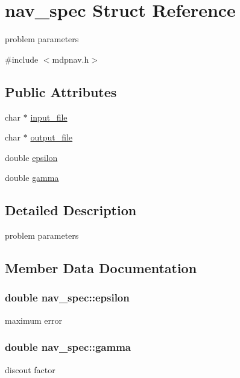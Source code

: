 \hypertarget{structnav__spec}{}\section{nav\+\_\+spec Struct Reference}
\label{structnav__spec}


problem parameters  




{\ttfamily \#include $<$mdpnav.\+h$>$}

\subsection*{Public Attributes}
\begin{DoxyCompactItemize}
\item 
char $\ast$ \hyperlink{structnav__spec_abb0e727791cf0839df7cea5433bff423}{input\+\_\+file}
\item 
char $\ast$ \hyperlink{structnav__spec_a9d92be20ca9352274aa021679e5c2020}{output\+\_\+file}
\item 
double \hyperlink{structnav__spec_ab195081971e36486ede5ebc50891d75b}{epsilon}
\item 
double \hyperlink{structnav__spec_a9823261754c163d75ef52c2accfe66b8}{gamma}
\end{DoxyCompactItemize}


\subsection{Detailed Description}
problem parameters 

\subsection{Member Data Documentation}
\subsubsection[{\texorpdfstring{epsilon}{epsilon}}]{\setlength{\rightskip}{0pt plus 5cm}double nav\+\_\+spec\+::epsilon}\hypertarget{structnav__spec_ab195081971e36486ede5ebc50891d75b}{}\label{structnav__spec_ab195081971e36486ede5ebc50891d75b}
maximum error 
\subsubsection[{\texorpdfstring{gamma}{gamma}}]{\setlength{\rightskip}{0pt plus 5cm}double nav\+\_\+spec\+::gamma}\hypertarget{structnav__spec_a9823261754c163d75ef52c2accfe66b8}{}\label{structnav__spec_a9823261754c163d75ef52c2accfe66b8}
discout factor 
